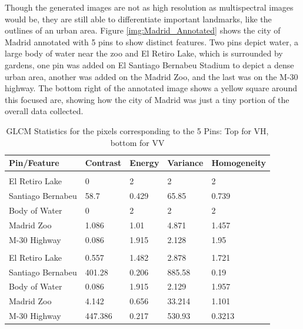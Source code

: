 \documentclass[conference]{IEEEtran}
\begin{document}
	Though the generated images are not as high resolution as multispectral images would be, 
	they are still able to differentiate important landmarks, like the outlines of an urban area.
	Figure \ref{img:Madrid_Annotated} shows the city of Madrid annotated with 5 pins to show distinct features.
	Two pins depict water, a large body of water near the zoo and El Retiro Lake, which is surrounded by gardens, one pin was added on El Santiago Bernabeu Stadium to depict a dense urban area, another was added on the Madrid Zoo, and the last was on the M-30 highway.
	The bottom right of the annotated image shows a yellow square around this focused are, showing how the city of Madrid was just a tiny portion of the overall data collected.
	
	\begin{table}[htbp]
		\caption{GLCM Statistics for the pixels corresponding to the 5 Pins: Top for VH, bottom for VV}
		\centering
		\begin{tabular}{lllll} %
			\\[1ex]
			Pin/Feature & Contrast & Energy & Variance & Homogeneity\\ %
			\hline\hline %
			\\[1ex]
			El Retiro Lake 		& 0		& 2		& 2		& 2 	\\
			Santiago Bernabeu 	& 58.7 	& 0.429	& 65.85	& 0.739 \\
			Body of Water 		& 0		& 2		& 2		& 2		\\
			Madrid Zoo			& 1.086 & 1.01	& 4.871	& 1.457 \\
			M-30 Highway 		& 0.086 & 1.915	& 2.128	& 1.95	\\[1ex] %
			\hline %
			\hline %
			\\[1ex]
			El Retiro Lake 		& 0.557		& 1.482		& 2.878 	& 1.721 \\
			Santiago Bernabeu 	& 401.28 	& 0.206		& 885.58	& 0.19	\\
			Body of Water 		& 0.086		& 1.915		& 2.129		& 1.957 \\
			Madrid Zoo			& 4.142 	& 0.656		& 33.214	& 1.101 \\
			M-30 Highway 		& 447.386   & 0.217		& 530.93	& 0.3213 \\[1ex] %
		\end{tabular}
		\label{tab:glcm_results}
	\end{table}
\end{document}
